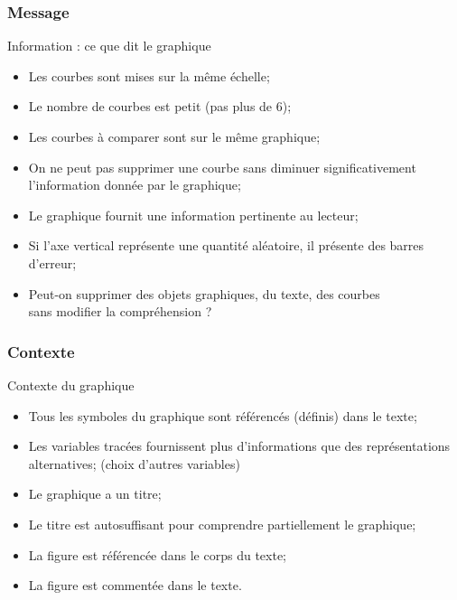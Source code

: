\documentclass[xcolor=x11names,compress,8pt,fleqn]{beamer}
\renewcommand{\(}{\begin{columns}}
\renewcommand{\)}{\end{columns}}
\newcommand{\<}[1]{\begin{column}{#1}}
\renewcommand{\>}{\end{column}}
\begin{document}
\begin{frame}
\frametitle{Message}
\begin{alertblock}{Information : ce que dit le graphique}
\begin{itemize}
\item  Les courbes sont mises sur la même échelle;
\item  Le nombre de courbes est petit (pas plus de $6$);
\item  Les courbes à comparer sont sur le même graphique;
\item  On ne peut pas supprimer une courbe sans diminuer significativement l'information donnée par le graphique;
\item  Le graphique fournit une information pertinente au lecteur;
\item  Si l'axe vertical représente une quantité aléatoire, il présente des barres d'erreur;
\item  Peut-on supprimer des objets graphiques, du texte, des courbes \\
sans modifier la compréhension ?
\end{itemize}
\end{alertblock}
\end{frame}

\begin{frame}
\frametitle{Contexte}

\begin{alertblock}{Contexte du graphique}
\begin{itemize}
\item  Tous les symboles du graphique sont référencés (définis) dans le texte;
\item  Les variables tracées fournissent plus d'informations que des représentations alternatives; (choix d'autres variables)
\item  Le graphique a un titre;
\item  Le titre est autosuffisant pour comprendre partiellement le graphique;
\item  La figure est référencée dans le corps du texte;
\item  La figure est commentée dans le texte.
\end{itemize}
\end{alertblock}
\end{frame}
\end{document}
